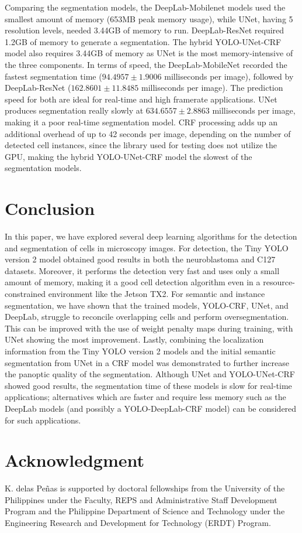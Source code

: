 \documentclass[10pt, journal, compsoc]{IEEEtran}
\begin{document}
Comparing the segmentation models, the DeepLab-Mobilenet models used the smallest amount of memory (653MB peak memory usage), while UNet, having 5 resolution levels, needed 3.44GB of memory to run. DeepLab-ResNet required 1.2GB of memory to generate a segmentation. The hybrid YOLO-UNet-CRF model also requires 3.44GB of memory as UNet is the most memory-intensive of the three components. In terms of speed, the DeepLab-MobileNet recorded the fastest segmentation time ($94.4957\pm1.9006$ milliseconds per image), followed by DeepLab-ResNet ($162.8601\pm11.8485$ milliseconds per image). The prediction speed for both are ideal for real-time and high framerate applications. UNet produces segmentation really slowly at $634.6557\pm2.8863$ milliseconds per image, making it a poor real-time segmentation model. CRF processing adds up an additional overhead of up to 42 seconds per image, depending on the number of detected cell instances, since the library used for testing does not utilize the GPU, making the hybrid YOLO-UNet-CRF model the slowest of the segmentation models.
\section{Conclusion}
In this paper, we have explored several deep learning algorithms for the detection and segmentation of cells in microscopy images. For detection, the Tiny YOLO version 2 model obtained good results in both the neuroblastoma and C127 datasets. Moreover, it performs the detection very fast and uses only a small amount of memory, making it a good cell detection algorithm even in a resource-constrained environment like the Jetson TX2. For semantic and instance segmentation, we have shown that the trained models, YOLO-CRF, UNet, and DeepLab, struggle to reconcile overlapping cells and perform oversegmentation. This can be improved with the use of weight penalty maps during training, with UNet showing the most improvement. Lastly, combining the localization information from the Tiny YOLO version 2 models and the initial semantic segmentation from UNet in a CRF model was demonstrated to further increase the panoptic quality of the segmentation. Although UNet and YOLO-UNet-CRF showed good results, the segmentation time of these models is slow for real-time applications; alternatives which are faster and require less memory  such as the DeepLab models (and possibly a YOLO-DeepLab-CRF model) can be considered for such applications.

\section*{Acknowledgment}
K. delas Pe\~nas is supported by doctoral fellowships from the University of the Philippines under the Faculty, REPS and Administrative Staff Development Program and the Philippine Department of Science and Technology under the Engineering Research and Development for Technology (ERDT) Program.
\end{document}
